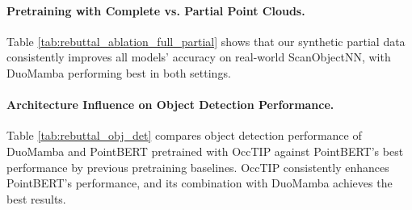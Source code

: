 \paragraph{Pretraining with Complete vs. Partial Point Clouds.} Table \ref{tab:rebuttal_ablation_full_partial} shows that our synthetic partial data consistently improves all models' accuracy on real-world ScanObjectNN, with DuoMamba performing best in both settings.
\begin{table}[h!]
\centering
\setlength\aboverulesep{0pt}\setlength\belowrulesep{0pt}
    \setlength{\tabcolsep}{6.5pt}  %
\caption{ScanObjectNN accuracy when pretraining with full vs partial data.}
\label{tab:rebuttal_ablation_full_partial}
\end{table}

\paragraph{Architecture Influence on Object Detection Performance.} 
Table \ref{tab:rebuttal_obj_det} compares object detection performance of DuoMamba and PointBERT pretrained with OccTIP against PointBERT’s best performance by previous pretraining baselines. OccTIP consistently enhances PointBERT’s performance, and its combination with DuoMamba achieves the best results.
\begin{table}[h!]
\centering
\setlength\aboverulesep{0pt}\setlength\belowrulesep{0pt}
    \setlength{\tabcolsep}{6.5pt}  %
\caption{Detection results of different models and pretraining methods.}
\label{tab:rebuttal_obj_det}    
\end{table}